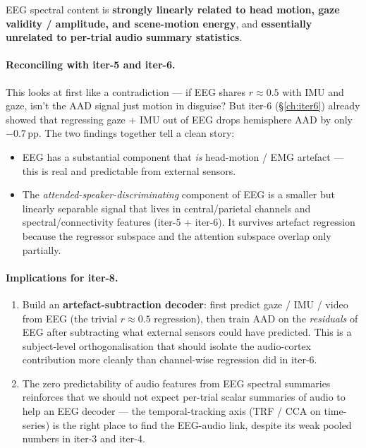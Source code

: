 EEG spectral content is \textbf{strongly linearly related to head
motion, gaze validity / amplitude, and scene-motion energy}, and
\textbf{essentially unrelated to per-trial audio summary statistics}.

\paragraph{Reconciling with iter-5 and iter-6.}
This looks at first like a contradiction --- if EEG shares $r \approx
0.5$ with IMU and gaze, isn't the AAD signal just motion in disguise?
But iter-6 (§\ref{ch:iter6}) already showed that regressing gaze + IMU
out of EEG drops hemisphere AAD by only $-0.7$\,pp. The two findings
together tell a clean story:

\begin{itemize}
  \item EEG has a substantial component that \emph{is} head-motion /
        EMG artefact — this is real and predictable from external sensors.
  \item The \emph{attended-speaker-discriminating} component of EEG is
        a smaller but linearly separable signal that lives in
        central/parietal channels and spectral/connectivity features
        (iter-5 + iter-6). It survives artefact regression because the
        regressor subspace and the attention subspace overlap only
        partially.
\end{itemize}

\paragraph{Implications for iter-8.}
\begin{enumerate}
  \item Build an \textbf{artefact-subtraction decoder}: first predict
        gaze / IMU / video from EEG (the trivial $r \approx 0.5$
        regression), then train AAD on the \emph{residuals} of EEG
        after subtracting what external sensors could have predicted.
        This is a subject-level orthogonalisation that should isolate
        the audio-cortex contribution more cleanly than channel-wise
        regression did in iter-6.
  \item The zero predictability of audio features from EEG spectral
        summaries reinforces that we should not expect per-trial
        scalar summaries of audio to help an EEG decoder --- the
        temporal-tracking axis (TRF / CCA on time-series) is the
        right place to find the EEG-audio link, despite its weak
        pooled numbers in iter-3 and iter-4.
\end{enumerate}
